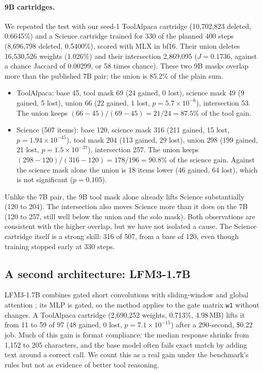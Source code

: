 \documentclass[11pt]{article}
\begin{document}
\paragraph{9B cartridges.} We repeated the test with our seed-1 ToolAlpaca cartridge (10,702,823 deleted, 0.6645\%) and a Science cartridge trained for 330 of the planned 400 steps (8,696,798 deleted, 0.5400\%), scored with MLX in bf16. Their union deletes 16,530,526 weights (1.026\%) and their intersection 2,869,095 ($J = 0.1736$, against a chance Jaccard of $0.00299$, or 58 times chance). These two 9B masks overlap more than the published 7B pair; the union is 85.2\% of the plain sum.
\begin{itemize}
\item ToolAlpaca: base 45, tool mask 69 (24 gained, 0 lost), science mask 49 (9 gained, 5 lost), union 66 (22 gained, 1 lost, $p = 5.7\times10^{-6}$), intersection 53. The union keeps $(66-45)/(69-45) = 21/24 = 87.5\%$ of the tool gain.
\item Science (507 items): base 120, science mask 316 (211 gained, 15 lost, $p = 1.94\times10^{-45}$), tool mask 204 (113 gained, 29 lost), union 298 (199 gained, 21 lost, $p = 1.5\times10^{-37}$), intersection 257. The union keeps $(298-120)/(316-120) = 178/196 = 90.8\%$ of the science gain. Against the science mask alone the union is 18 items lower (46 gained, 64 lost), which is not significant ($p = 0.105$).
\end{itemize}
Unlike the 7B pair, the 9B tool mask alone already lifts Science substantially (120 to 204). The intersection also moves Science more than it does on the 7B (120 to 257, still well below the union and the solo mask). Both observations are consistent with the higher overlap, but we have not isolated a cause. The Science cartridge itself is a strong skill: 316 of 507, from a base of 120, even though training stopped early at 330 steps.

\subsection{A second architecture: LFM3-1.7B}
\label{sec:lfm}

LFM3-1.7B combines gated short convolutions with sliding-window and global attention \citep{liquid2026lfm3}; its MLP is gated, so the method applies to the gate matrix \texttt{w1} without changes. A ToolAlpaca cartridge (2,690,252 weights, 0.713\%, 4.98\,MB) lifts it from 11 to 59 of 97 (48 gained, 0 lost, $p = 7.1\times10^{-15}$) after a 290-second, \$0.22 job. Much of this gain is format compliance: the median response shrinks from 1,152 to 205 characters, and the base model often fails exact match by adding text around a correct call. We count this as a real gain under the benchmark's rules but not as evidence of better tool reasoning.
\end{document}
